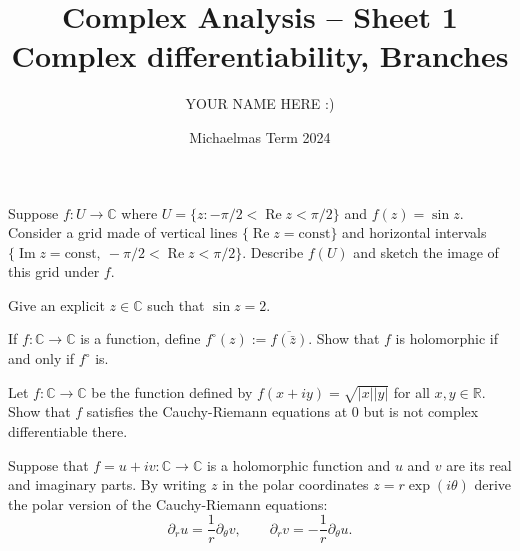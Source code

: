 \documentclass[answers]{exam}
\title{Complex Analysis -- Sheet 1\\Complex differentiability, Branches}
\author{YOUR NAME HERE :)}
\date{Michaelmas Term 2024}
\begin{document}
\maketitle
\begin{questions}

\question%



\question%
Suppose $f:U\to\mathbb C$ where $U=\{z:-\pi/2<\operatorname{Re}z<\pi/2\}$ and $f(z)=\sin z$. Consider a grid made of vertical lines $\{\operatorname{Re}z=\text{const}\}$ and horizontal intervals $\{\operatorname{Im}z=\text{const},\ -\pi/2<\operatorname{Re}z<\pi/2\}$. Describe $f(U)$ and sketch the image of this grid under $f$.



\question%
Give an explicit $z \in \mathbb{C}$ such that $\sin z=2$.



\question%
If $f: \mathbb{C} \to \mathbb{C}$ is a function, define $f^{\circ}(z):=\overline{f(\bar{z})}$. Show that $f$ is holomorphic if and only if $f^{\circ}$ is.



\question%
Let $f: \mathbb{C} \to \mathbb{C}$ be the function defined by $f(x+i y)=\sqrt{|x||y|}$ for all $x, y \in \mathbb{R}$. Show that $f$ satisfies the Cauchy-Riemann equations at 0 but is not complex differentiable there.



\question%
Suppose that $f=u+iv:\mathbb C\to\mathbb C$ is a holomorphic function and $u$ and $v$ are its real and imaginary parts. By writing $z$ in the polar coordinates $z=r\exp(i\theta)$ derive the polar version of the Cauchy-Riemann equations: \[
	\partial_ru=\frac1r\partial_\theta v,\qquad
	\partial_rv=-\frac1r\partial_\theta u.
\]




\end{questions}
\end{document}
